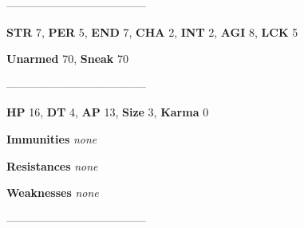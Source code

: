 \documentclass[11pt,a4paper,twocolumn]{book}
\begin{document}
%		
%	
%		

	--------------------------------------

	\noindent
	\textbf{STR} 7, \textbf{PER} 5, \textbf{END} 7, \textbf{CHA} 2, \textbf{INT} 2, \textbf{AGI} 8, \textbf{LCK} 5
	
	\noindent
	\textbf{Unarmed} 70, \textbf{Sneak} 70
	
	--------------------------------------
	
	\noindent
	\textbf{HP} 16, \textbf{DT} 4, \textbf{AP} 13, \textbf{Size} 3, \textbf{Karma} 0
	
	
	\noindent
	\textbf{Immunities} \emph{none}
	
	\noindent
	\textbf{Resistances} \emph{none}
	
	\noindent
	\textbf{Weaknesses} \emph{none} %
	
	--------------------------------------
	
\end{document}
